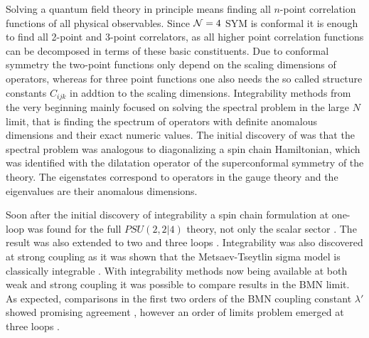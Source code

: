 Solving a quantum field theory in principle means finding all $n$-point correlation functions of all physical observables. 
Since $\mathcal{N}=4$ SYM is conformal it is enough to find all 2-point and 3-point correlators, as all higher point correlation functions can be decomposed in terms of these basic constituents.
Due to conformal symmetry the two-point functions only depend on the scaling dimensions of operators, whereas for three point functions one also needs the so called structure constants $C_{ijk}$ in addtion to the scaling dimensions.
Integrability methods from the very beginning mainly focused on solving the spectral problem in the large $N$ limit, that is finding the spectrum of operators with definite anomalous dimensions and their exact numeric values.
The initial discovery of \cite{Minahan:2002ve} was that the spectral problem was analogous to diagonalizing a spin chain Hamiltonian, which was identified with the dilatation operator of the superconformal symmetry of the theory.
The eigenstates correspond to operators in the gauge theory and the eigenvalues are their anomalous dimensions.

Soon after the initial discovery of integrability a spin chain formulation at one-loop was found for the full $PSU(2,2|4)$ theory, not only the scalar sector \cite{Beisert:2003jj}. 
The result was also extended to two and three loops \cite{Beisert:2003tq}. 
Integrability was also discovered at strong coupling as it was shown that the Metsaev-Tseytlin sigma model is classically integrable \cite{Bena:2003wd}. 
With integrability methods now being available at both weak and strong coupling it was possible to compare results in the BMN limit.
As expected, comparisons in the first two orders of the BMN coupling constant $\lambda'$ showed promising agreement \cite{Frolov:2003qc, Frolov:2003xy, Arutyunov:2003uj}, however an order of limits problem emerged at three loops \cite{Beisert:2003tq}. 

